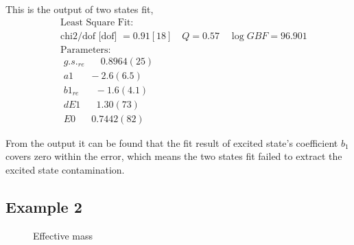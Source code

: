\documentclass{article}
\begin{document}
This is the output of two states fit,
\begin{equation}
    \begin{aligned}
    &\text { Least Square Fit: } \\
    &\text { chi2/dof [dof] }=0.91[18] \quad Q=0.57 \quad \log G B F=96.901 \\
    &\text { Parameters: } \\
    &\text { $g.s._{re}$ } \quad 0.8964 (25) \\
    &\text { $a1$ } \quad -2.6 (6.5) \\
    &\text { $b1_{re}$ } \quad -1.6 (4.1) \\
    &\text { $dE1$ } \quad 1.30 (73) \\
    &\text { $E0$ } \quad 0.7442 (82)
    \end{aligned}
\end{equation}

From the output it can be found that the fit result of excited state's coefficient $b_1$ covers zero within the error, which means the two states fit failed to extract the excited state contamination.






\subsection{Example 2}

\begin{figure}[htbp]
    \centering
    \centering
    \caption{Effective mass}
\end{figure}
\end{document}
